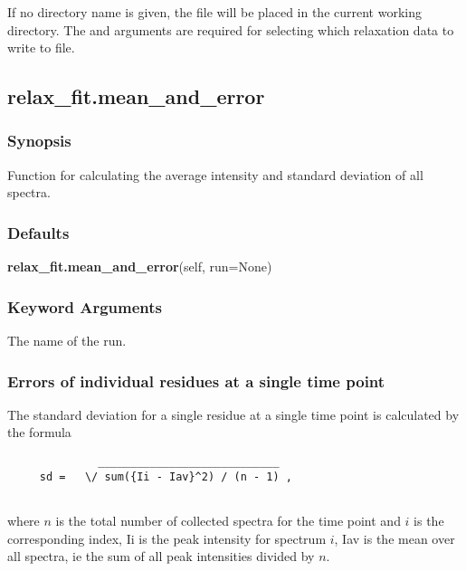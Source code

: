  If no directory name is given, the file will be placed in the current working directory. The  and  arguments are required for selecting which relaxation data to write to file. 
  

  

 \newpage 

 \subsection{relax\_fit.mean\_and\_error} 

  
 \subsubsection{Synopsis} 

 Function for calculating the average intensity and standard deviation of all spectra. 
  

  
 \subsubsection{Defaults} 

 \textsf{\textbf{relax\_fit.mean\_and\_error}(self, run=None)} 

  
 \subsubsection{Keyword Arguments} 

   The name of the run.  

  

  
 \subsubsection{Errors of individual residues at a single time point} 

 The standard deviation for a single residue at a single time point is calculated by the formula 
  

 {\footnotesize \begin{verbatim} 
              ____________________________ 
     sd =   \/ sum({Ii - Iav}^2) / (n - 1) , 
  
 \end{verbatim}} 

 where $n$ is the total number of collected spectra for the time point and $i$ is the corresponding index, Ii is the peak intensity for spectrum $i$, Iav is the mean over all spectra, ie the sum of all peak intensities divided by $n$. 
  

